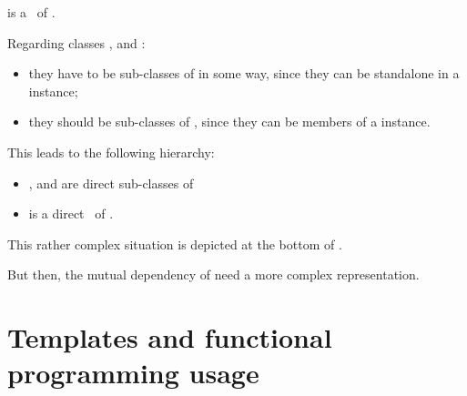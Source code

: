  is a \subClass\ of .

Regarding classes ,  and :
\begin{itemize}
\item they have to be sub-classes of  in some way, since they can be standalone in a  instance;

\item they should be sub-classes of , since they can be members of a  instance.
\end{itemize}

This leads to the following hierarchy:
\begin{itemize}
\item {},  and  are direct sub-classes of 

\item {} is a direct \subClass\ of .
\end{itemize}

This rather complex situation is depicted at the bottom of .

But then, the mutual dependency of need a more complex representation.


\section{Templates and functional programming usage}

